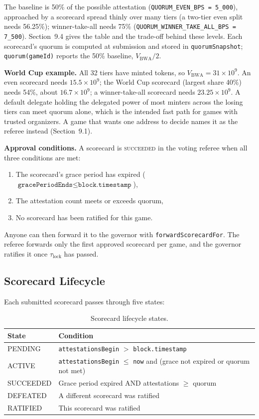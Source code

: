 \documentclass[11pt,a4paper]{article}
\begin{document}
The baseline is 50\% of the possible attestation (\texttt{QUORUM\_EVEN\_BPS = 5\_000}), approached by a scorecard spread thinly over many tiers (a two-tier even split needs 56.25\%); winner-take-all needs 75\% (\texttt{QUORUM\_WINNER\_TAKE\_ALL\_BPS = 7\_500}). Section~9.4 gives the table and the trade-off behind these levels. Each scorecard's quorum is computed at submission and stored in \texttt{quorumSnapshot}; \texttt{quorum(gameId)} reports the 50\% baseline, $V_{\text{BWA}} / 2$.

\textbf{World Cup example.} All 32 tiers have minted tokens, so $V_{\text{BWA}} = 31 \times 10^9$. An even scorecard needs $15.5 \times 10^9$; the World Cup scorecard (largest share 40\%) needs 54\%, about $16.7 \times 10^9$; a winner-take-all scorecard needs $23.25 \times 10^9$. A default delegate holding the delegated power of most minters across the losing tiers can meet quorum alone, which is the intended fast path for games with trusted organizers. A game that wants one address to decide names it as the referee instead (Section~9.1).

\textbf{Approval conditions.} A scorecard is \textsc{succeeded} in the voting referee when all three conditions are met:
\begin{enumerate}[nosep]
    \item The scorecard's grace period has expired ($\texttt{gracePeriodEnds} \leq \texttt{block.timestamp}$),
    \item The attestation count meets or exceeds quorum,
    \item No scorecard has been ratified for this game.
\end{enumerate}

Anyone can then forward it to the governor with \texttt{forwardScorecardFor}. The referee forwards only the first approved scorecard per game, and the governor ratifies it once $\tau_{\text{lock}}$ has passed.

\subsection{Scorecard Lifecycle}

Each submitted scorecard passes through five states:

\begin{table}[H]
\centering
\begin{tabular}{ll}
\toprule
\textbf{State} & \textbf{Condition} \\
\midrule
PENDING & \texttt{attestationsBegin} $>$ \texttt{block.timestamp} \\
ACTIVE & \texttt{attestationsBegin} $\leq$ \texttt{now} and (grace not expired or quorum not met) \\
SUCCEEDED & Grace period expired AND attestations $\geq$ quorum \\
DEFEATED & A different scorecard was ratified \\
RATIFIED & This scorecard was ratified \\
\bottomrule
\end{tabular}
\caption{Scorecard lifecycle states.}
\end{table}
\end{document}
